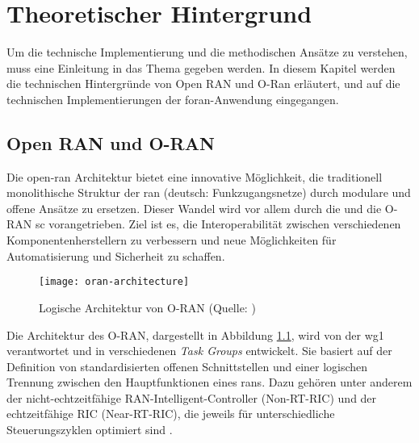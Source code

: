 \chapter{Theoretischer Hintergrund}
\label{chap:technischerHintergrund}
Um die technische Implementierung und die methodischen Ansätze zu verstehen, muss eine Einleitung in das Thema gegeben werden. In diesem Kapitel werden die technischen Hintergründe von Open RAN und O-Ran erläutert, und auf die technischen Implementierungen der \gls{foran}-Anwendung eingegangen.

\section{Open RAN und O-RAN}
\label{sec:tech-openran}
Die \gls{open-ran} Architektur bietet eine innovative Möglichkeit, die traditionell monolithische Struktur der \gls{ran} (deutsch: Funkzugangsnetze) durch modulare und offene Ansätze zu ersetzen. Dieser Wandel wird vor allem durch die \orana und die O-RAN \gls{sc} vorangetrieben. Ziel ist es, die Interoperabilität zwischen verschiedenen Komponentenherstellern zu verbessern und neue Möglichkeiten für Automatisierung und Sicherheit zu schaffen.

\begin{figure}[H]
    \centering
    \texttt{[image: oran-architecture]}
    \caption{Logische Architektur von O-RAN (Quelle: \autocite{ORANAlliance})}
    \label{fig:oran-architecture}
\end{figure}

Die Architektur des O-RAN, dargestellt in Abbildung \ref{fig:oran-architecture}, wird von der \gls{wg1} verantwortet und in verschiedenen \textit{Task Groups} entwickelt. Sie basiert auf der Definition von standardisierten offenen Schnittstellen und einer logischen Trennung zwischen den Hauptfunktionen eines \glspl{ran}. Dazu gehören unter anderem der nicht-echtzeitfähige RAN-Intelligent-Controller (Non-RT-RIC) und der echtzeitfähige RIC (Near-RT-RIC), die jeweils für unterschiedliche Steuerungszyklen optimiert sind \autocite{o-ranworkgroup1usecasesandoverallarchitectureORANArchitectureDescription2024}. 

